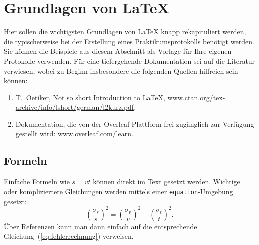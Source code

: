 \documentclass[twoside]{protokoll}
\begin{document}
%
%
%
%






%
\clearpage
\section*{Grundlagen von \LaTeX}
Hier sollen die wichtigsten Grundlagen von \LaTeX{} knapp rekapituliert
werden, die typischerweise bei der Erstellung eines
Praktikumsprotokolls benötigt werden. Sie können die Beispiele aus
diesem Abschnitt als Vorlage für Ihre eigenen Protokolle
verwenden. Für eine tiefergehende Dokumentation sei auf die Literatur
verwiesen, wobei zu Beginn insbesondere die folgenden Quellen
hilfreich sein können:
\begin{enumerate}
\item T.~Oetiker, Not so short Introduction to \LaTeX,
  \url{www.ctan.org/tex-archive/info/lshort/german/l2kurz.pdf}.
\item Dokumentation, die von der Overleaf-Plattform frei zugänglich
  zur Verfügung gestellt wird: \url{www.overleaf.com/learn}.
\end{enumerate}

\subsection*{Formeln}
Einfache Formeln wie $s=vt$ können direkt im Text gesetzt
werden. Wichtige oder kompliziertere Gleichungen werden mittels einer
\texttt{equation}-Umgebung gesetzt:
\begin{equation}
  \label{eq:fehlerrechnung}
  \left(\frac{\sigma_s}{s}\right)^2 =
  \left(\frac{\sigma_v}{v}\right)^2 +
  \left(\frac{\sigma_t}{t}\right)^2.
\end{equation}
Über Referenzen kann man dann einfach auf die entsprechende
Gleichung~(\ref{eq:fehlerrechnung}) verweisen.
\end{document}
